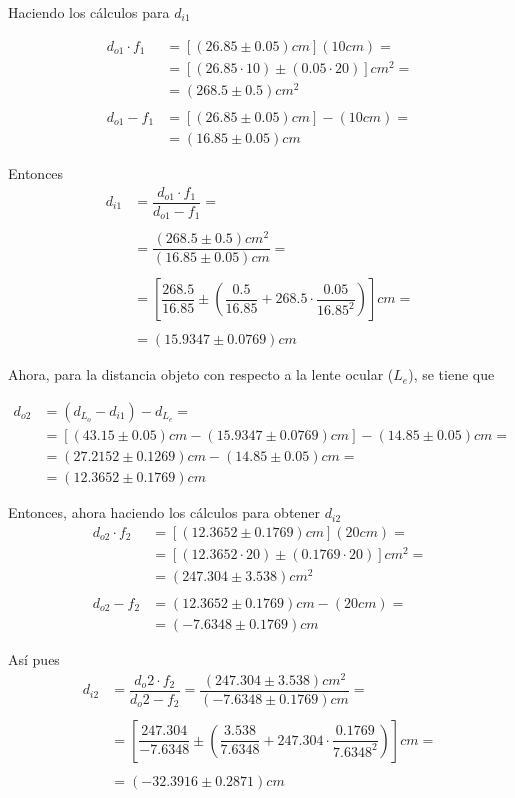 \documentclass[a4paper, 10pt]{article}
\begin{document}
	Haciendo los cálculos para $ d_{i1} $
	
	\begin{align*}
		d_{o1}\cdot f_1&=[(26.85\pm 0.05)cm](10cm)=\\	&=[(26.85\cdot10)\pm(0.05\cdot20)]cm^2=\\
		&=(268.5\pm0.5)cm^2\\\\
		d_{o1}-f_1&=[(26.85\pm 0.05)cm]-(10cm)=\\
		&=(16.85\pm0.05) cm
	\end{align*}
	
	Entonces
	\begin{align*}
		d_{i1}&=\dfrac{d_{o1}\cdot f_1}{d_{o1}-f_1}=\\\\
		&=\dfrac{(268.5\pm0.5)cm^2}{(16.85\pm0.05) cm}=\\\\
		&=\left[\dfrac{268.5}{16.85}\pm\left(\dfrac{0.5}{16.85}+
		268.5\cdot\dfrac{0.05}{16.85^2}\right)\right]cm=\\\\
		&=(15.9347\pm0.0769)cm
	\end{align*}
	
	Ahora, para la distancia objeto con respecto a la lente ocular ($ L_e $), se tiene que
	
	\begin{align*}
		d_{o2}&=(d_{L_o}-d_{i1})-d_{L_e}=\\
		&=[(43.15\pm0.05)cm-(15.9347\pm0.0769)cm]-(14.85\pm0.05)cm=\\
		&=(27.2152\pm0.1269)cm-(14.85\pm0.05)cm=\\
		&=(12.3652\pm0.1769)cm
	\end{align*} 

	
	Entonces, ahora haciendo los cálculos para obtener $d_{i2}$
	\begin{align*}
		d_{o2}\cdot f_2&=[(12.3652\pm0.1769)cm](20cm)=\\
		&=\left[(12.3652\cdot20)\pm\left(0.1769\cdot20\right)\right]cm^2=\\
		&=(247.304\pm3.538)cm^2\\\\
		d_{o2}-f_2&=(12.3652\pm0.1769)cm-(20cm)=\\
		&=(-7.6348\pm0.1769)cm
	\end{align*}

	Así pues 
	\begin{align*}
		d_{i2}&=\dfrac{d_o2\cdot f_2}{d_o2-f_2}=\dfrac{(247.304\pm3.538)cm^2}{(-7.6348\pm0.1769)cm}=\\\\
		&=\left[\dfrac{247.304}{-7.6348}\pm\left(\dfrac{3.538}{7.6348}+247.304\cdot\dfrac{0.1769}{7.6348^2}\right)\right]cm=\\\\
		&=(-32.3916\pm 0.2871)cm
	\end{align*}
\end{document}
